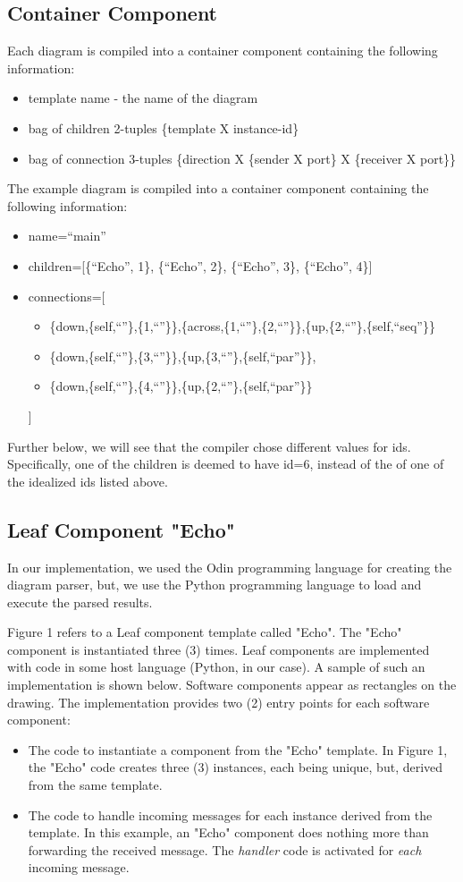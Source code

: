 \documentclass[10pt,anonymous,review]{acmart}
\begin{document}
\subsection{Container Component}
Each diagram is compiled into a container component containing the following information:
\begin{itemize}
\item template name - the name of the diagram
\item bag of children 2-tuples \{template X instance-id\}
\item bag of connection 3-tuples \{direction X \{sender X port\} X \{receiver X port\}\}
\end{itemize}
The example diagram is compiled into a container component containing the following information:
\begin{itemize}
\item name=“main”
\item children=[\{“Echo”, 1\}, \{“Echo”, 2\}, \{“Echo”, 3\}, \{“Echo”, 4\}]
\item connections=[
\begin{itemize}
  \item[] \{down,\{self,``''\},\{1,``”\}\},\{across,\{1,``”\},\{2,``”\}\},\{up,\{2,``”\},\{self,``seq''\}\}
  \item[] \{down,\{self,``”\},\{3,``”\}\},\{up,\{3,``”\},\{self,``par”\}\},
  \item[] \{down,\{self,``”\},\{4,``”\}\},\{up,\{2,``”\},\{self,``par”\}\}
\end{itemize}
]
\end{itemize}
Further below, we will see that the compiler chose different values for ids.
Specifically, one of the children is deemed to have id=6, instead of the of one of the idealized ids listed above.


\subsection{Leaf Component "Echo"}
In our implementation, we used the Odin programming language for
creating the diagram parser, but, we use the Python programming
language to load and execute the parsed results.

Figure 1 refers to a Leaf component template called "Echo". The "Echo"
component is instantiated three (3) times. Leaf components are
implemented with code in some host language (Python, in our case). A
sample of such an implementation is shown below. Software components
appear as rectangles on the drawing. The implementation provides two (2)
entry points for each software component:
\begin{itemize}
\item The code to instantiate a component from the "Echo" template. In Figure
1, the "Echo" code creates three (3) instances, each being unique, but,
derived from the same template.

\item The code to handle incoming messages for each instance derived from the
template. In this example, an "Echo" component does nothing more than
forwarding the received message. The \emph{handler} code is activated for
\emph{each} incoming message.
\end{itemize}
\end{document}
